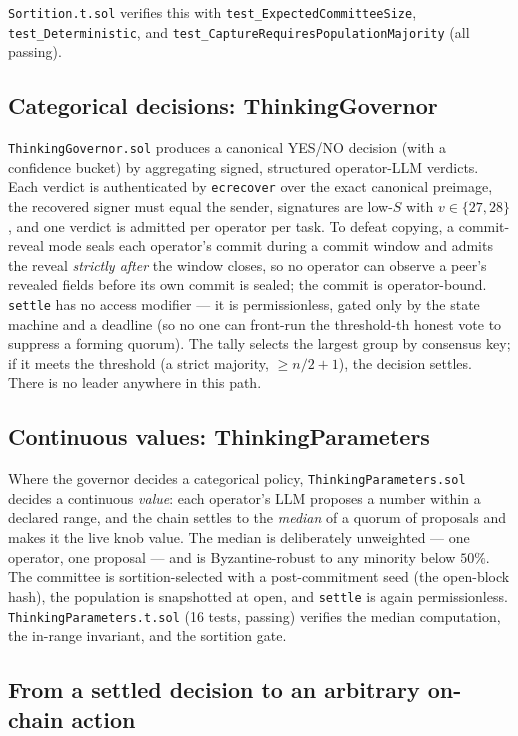 \documentclass[11pt,a4paper]{article}
\begin{document}
\texttt{Sortition.t.sol} verifies this with \texttt{test\_ExpectedCommitteeSize}, \texttt{test\_Deterministic}, and \texttt{test\_CaptureRequiresPopulationMajority} (all passing).

\subsection{Categorical decisions: ThinkingGovernor}\label{sec:governor}

\texttt{ThinkingGovernor.sol} produces a canonical YES/NO decision (with a confidence bucket) by aggregating signed, structured operator-LLM verdicts. Each verdict is authenticated by \texttt{ecrecover} over the exact canonical preimage, the recovered signer must equal the sender, signatures are low-$S$ with $v \in \{27,28\}$, and one verdict is admitted per operator per task. To defeat copying, a commit-reveal mode seals each operator's commit during a commit window and admits the reveal \emph{strictly after} the window closes, so no operator can observe a peer's revealed fields before its own commit is sealed; the commit is operator-bound. \texttt{settle} has no access modifier --- it is permissionless, gated only by the state machine and a deadline (so no one can front-run the threshold-th honest vote to suppress a forming quorum). The tally selects the largest group by consensus key; if it meets the threshold (a strict majority, $\ge n/2 + 1$), the decision settles. There is no leader anywhere in this path.

\subsection{Continuous values: ThinkingParameters}\label{sec:params}

Where the governor decides a categorical policy, \texttt{ThinkingParameters.sol} decides a continuous \emph{value}: each operator's LLM proposes a number within a declared range, and the chain settles to the \emph{median} of a quorum of proposals and makes it the live knob value. The median is deliberately unweighted --- one operator, one proposal --- and is Byzantine-robust to any minority below $50\%$. The committee is sortition-selected with a post-commitment seed (the open-block hash), the population is snapshotted at open, and \texttt{settle} is again permissionless. \texttt{ThinkingParameters.t.sol} (16 tests, passing) verifies the median computation, the in-range invariant, and the sortition gate.

\subsection{From a settled decision to an arbitrary on-chain action}\label{sec:execute}
\end{document}
